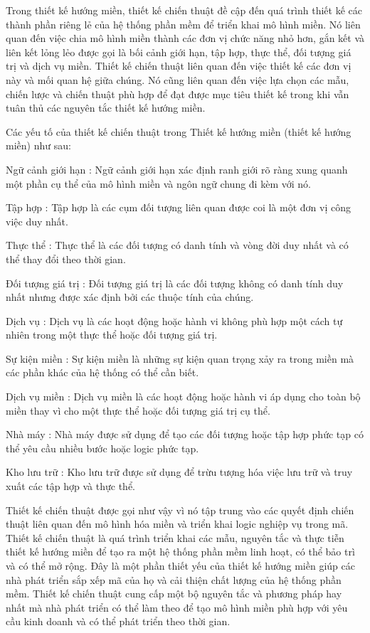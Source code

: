 

Trong thiết kế hướng miền, thiết kế chiến thuật đề cập đến quá trình thiết kế các thành phần riêng lẻ của hệ thống phần mềm để triển khai mô hình miền. Nó liên quan đến việc chia mô hình miền thành các đơn vị chức năng nhỏ hơn, gắn kết và liên kết lỏng lẻo được gọi là bối cảnh giới hạn, tập hợp, thực thể, đối tượng giá trị và dịch vụ miền. Thiết kế chiến thuật liên quan đến việc thiết kế các đơn vị này và mối quan hệ giữa chúng. Nó cũng liên quan đến việc lựa chọn các mẫu, chiến lược và chiến thuật phù hợp để đạt được mục tiêu thiết kế trong khi vẫn tuân thủ các nguyên tắc thiết kế hướng miền.

Các yếu tố của thiết kế chiến thuật trong Thiết kế hướng miền (thiết kế hướng miền) như sau:

Ngữ cảnh giới hạn : Ngữ cảnh giới hạn xác định ranh giới rõ ràng xung quanh một phần cụ thể của mô hình miền và ngôn ngữ chung đi kèm với nó.

Tập hợp : Tập hợp là các cụm đối tượng liên quan được coi là một đơn vị công việc duy nhất.

Thực thể : Thực thể là các đối tượng có danh tính và vòng đời duy nhất và có thể thay đổi theo thời gian.

Đối tượng giá trị : Đối tượng giá trị là các đối tượng không có danh tính duy nhất nhưng được xác định bởi các thuộc tính của chúng.

Dịch vụ : Dịch vụ là các hoạt động hoặc hành vi không phù hợp một cách tự nhiên trong một thực thể hoặc đối tượng giá trị.

Sự kiện miền : Sự kiện miền là những sự kiện quan trọng xảy ra trong miền mà các phần khác của hệ thống có thể cần biết.

Dịch vụ miền : Dịch vụ miền là các hoạt động hoặc hành vi áp dụng cho toàn bộ miền thay vì cho một thực thể hoặc đối tượng giá trị cụ thể.

Nhà máy : Nhà máy được sử dụng để tạo các đối tượng hoặc tập hợp phức tạp có thể yêu cầu nhiều bước hoặc logic phức tạp.

Kho lưu trữ : Kho lưu trữ được sử dụng để trừu tượng hóa việc lưu trữ và truy xuất các tập hợp và thực thể.

Thiết kế chiến thuật được gọi như vậy vì nó tập trung vào các quyết định chiến thuật liên quan đến mô hình hóa miền và triển khai logic nghiệp vụ trong mã. Thiết kế chiến thuật là quá trình triển khai các mẫu, nguyên tắc và thực tiễn thiết kế hướng miền để tạo ra một hệ thống phần mềm linh hoạt, có thể bảo trì và có thể mở rộng. Đây là một phần thiết yếu của thiết kế hướng miền giúp các nhà phát triển sắp xếp mã của họ và cải thiện chất lượng của hệ thống phần mềm. Thiết kế chiến thuật cung cấp một bộ nguyên tắc và phương pháp hay nhất mà nhà phát triển có thể làm theo để tạo mô hình miền phù hợp với yêu cầu kinh doanh và có thể phát triển theo thời gian.

